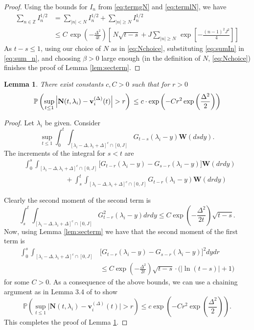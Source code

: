 \documentclass[12pt]{amsart}
\numberwithin{equation}{section}
\newtheorem{lem}{Lemma}[section]
\theoremstyle{definition}
\numberwithin{equation}{section}
\newcommand{\bes}{\begin{equation*}}
\newcommand{\ees}{\end{equation*}}
\newcommand{\mP}{\mathbb{P}}
\newcommand{\Z}{\mathbb{Z}}
\newcommand{\N}{\mathbf{N}}
\newcommand{\W}{\mathbf W}
\newcommand{\vv}{\mathbf v}
\begin{document}
\begin{proof}
Using the bounds for $I_n$ from \eqref{eq:termgN} and \eqref{eq:termlN},
we have
\begin{align} \label{eq:sumIn}
  \sum_{n\in \Z}  I_n^{1/2} 
& =   \sum_{\mid n \mid < N} I_n^{1/2}  
      +   \sum_{\mid n \mid \geq N}  I_n^{1/2}  \nonumber \\
  & \le  C\,\exp\left(-\frac{\Delta^2}{4t}\right)
    \left [ \,N\sqrt{t-s}  
       + J\sum_{\mid n \mid \geq N}\,
         \exp\left[-\frac{(n-1)^2J^2}{4}\right] \right]
\end{align}
As $t-s\le 1$, using our choice of $N$ as in \eqref{eq:Nchoice}, 
substituting \eqref{eq:sumIn} in \eqref{eq:sum_n}, and choosing $\beta >0$ 
large enough (in the definition of $N$, \eqref{eq:Nchoice}) finishes the proof of 
Lemma \ref{lem:secterm}.  
\end{proof}


\begin{lem} \label{lem:N-v} There exist constants $c,C>0$ such that for $r>0$
\bes \mP\left(\sup_{t\le 1} \Big\vert \N(t,{\lambda}_i) - \vv_i^{(\Delta)}(t)\Big\vert >r\right) \\
 \le  c\cdot\exp\left(-C r^2 \exp\left(\frac{\Delta^2}{2} \right) \right)
\ees
\end{lem}

\begin{proof}
  Let $\lambda_i$ be given. Consider 
\[  \sup_{t\le 1} \int_0^t\int_{[\lambda_i-\Delta, \lambda_i+ \Delta]^c \cap[0,J]} G_{t-s}(\lambda_i-y) \W(ds dy).\]
The increments of the integral for $s<t$ are  
\begin{align*}
&  \int_0^s\int_{[\lambda_i-\Delta, \lambda_i+ \Delta]^c \cap[0,J]}\Big[ G_{t-r}(\lambda_i-y)-G_{s-r}(\lambda_i-y) \Big]\W(dr dy)\\& \hspace{1in} +\int_s^t\int_{[\lambda_i-\Delta, \lambda_i+ \Delta]^c \cap[0,J]}G_{t-r}(\lambda_i-y)\W(dr dy)
\end{align*}

Clearly the second moment of the second term is 
\[\int_s^t\int_{[\lambda_i-\Delta, \lambda_i+ \Delta]^c \cap[0,J]}G^2_{t-r}(\lambda_i-y)dr dy \le C \exp\left(-\frac{\Delta^2}{2t}\right)\sqrt{t-s}. \]
Now, using Lemma \ref{lem:secterm}  we have that the second moment of the first term is
\begin{align*}
\int_0^s\int_{[\lambda_i-\Delta, \lambda_i+ \Delta]^c \cap[0,J]} 
  & \Big[ G_{t-r}(\lambda_i-y)-G_{s-r}(\lambda_i-y) \Big]^2 dy dr\\
    &\leq  C\exp\left(-\frac{\Delta^2}{2t}\right)\sqrt{t-s}\cdot
       \big(|\ln(t-s)|+1\big)
\end{align*}
for some $C>0$.  As a consequence of the above bounds, we can use a 
chaining argument as in Lemma 3.4 of \cite{athr-jose-muel} to show
\bes
 \mP\left(\sup_{t\le 1} \Big\vert \N(t,{\lambda}_i) - \vv_i^{(\Delta)}(t)\Big\vert > r \right)  
 \le c\exp\left(-C r^2 \exp\left(\frac{\Delta^2}{2} \right) \right).
\ees
This completes the proof of Lemma \ref{lem:N-v}.  
\end{proof}
\end{document}

